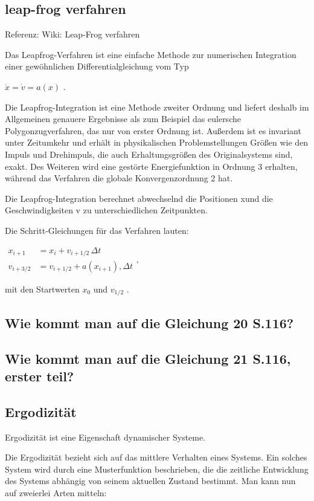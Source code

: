 \documentclass[]{article}
\begin{document}
\subsection{leap-frog verfahren}
Referenz: Wiki: Leap-Frog verfahren

Das Leapfrog-Verfahren ist eine einfache Methode zur numerischen Integration einer gewöhnlichen Differentialgleichung vom Typ

$ {\ddot {x}={\dot {v}}=a(x)}$ . 

Die Leapfrog-Integration ist eine Methode zweiter Ordnung und liefert deshalb im Allgemeinen genauere Ergebnisse als zum Beispiel das eulersche Polygonzugverfahren, das nur von erster Ordnung ist. Außerdem ist es invariant unter Zeitumkehr und erhält in physikalischen Problemstellungen Größen wie den Impuls und Drehimpuls, die auch Erhaltungsgrößen des Originalsystems sind, exakt. Des Weiteren wird eine gestörte Energiefunktion in Ordnung 3 erhalten, während das Verfahren die globale Konvergenzordnung 2 hat.

Die Leapfrog-Integration berechnet abwechselnd die Positionen xund die Geschwindigkeiten v  zu unterschiedlichen Zeitpunkten.

Die Schritt-Gleichungen für das Verfahren lauten:

$
 \begin{aligned}
 	x_{i+1}&=x_{i}+v_{i+1/2}\,\Delta t\\ v_{i+3/2}&=v_{i+1/2}+a(x_{i+1}),\Delta t
 \end{aligned} ,
$

mit den Startwerten $x_{0}$ und  $v_{1/2}$ .

\subsection{Wie kommt man auf die Gleichung 20 S.116?}

\subsection{Wie kommt man auf die Gleichung 21 S.116, erster teil?}


\subsection{Ergodizität}
Ergodizität ist eine Eigenschaft dynamischer Systeme.

Die Ergodizität bezieht sich auf das mittlere Verhalten eines Systems. Ein solches System wird durch eine Musterfunktion beschrieben, die die zeitliche Entwicklung des Systems abhängig von seinem aktuellen Zustand bestimmt. Man kann nun auf zweierlei Arten mitteln:
\end{document}
